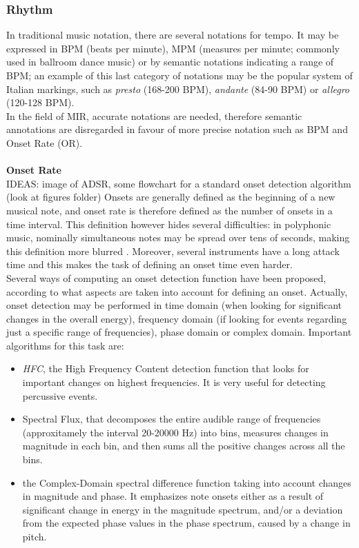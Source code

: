 \subsubsection{Rhythm}
In traditional music notation, there are several notations for tempo. It may be expressed in BPM (beats per minute), MPM (measures per minute; commonly used in ballroom dance music) or by semantic notations indicating a range of BPM; an example of this last category of notations may be the popular system of Italian markings, such as \textit{presto} (168-200 BPM), \textit{andante} (84-90 BPM) or \textit{allegro} (120-128 BPM). \\ In the field of MIR, accurate notations are needed, therefore semantic annotations are disregarded in favour of more precise notation such as BPM and Onset Rate (OR).
\\ \\ 
\textbf{Onset Rate} \\ 
IDEAS: image of ADSR, some flowchart for a standard onset detection algorithm (look at figures folder)
Onsets are generally defined as the beginning of a new musical note, and onset rate is therefore defined as the number of onsets in a time interval. This definition however hides several difficulties: in polyphonic music, nominally simultaneous notes may be spread over tens of seconds, making this definition more blurred \cite{dixon06}. Moreover, several instruments have a long attack time and this makes the task of defining an onset time even harder. \\Several ways of computing an onset detection function have been proposed, according to what aspects are taken into account for defining an onset. Actually, onset detection may be performed in time domain (when looking for significant changes in the overall energy), frequency domain (if looking for events regarding just a specific range of frequencies), phase domain or complex domain. 
Important algorithms for this task are:
\begin{itemize}
\item \textit{HFC}, the High Frequency Content detection function that looks for important changes on highest frequencies. It is very useful for detecting percussive events.
\item Spectral Flux, that decomposes the entire audible range of frequencies (approxitamely the interval 20-20000 Hz) into bins, measures changes in magnitude in each bin, and then sums all the positive changes across all the bins.
\item the Complex-Domain spectral difference function \cite{bello04} taking into account changes in magnitude and phase. It emphasizes note onsets either as a result of significant change in energy in the magnitude spectrum, and/or a deviation from the expected phase values in the phase spectrum, caused by a change in pitch.
\end{itemize}  
